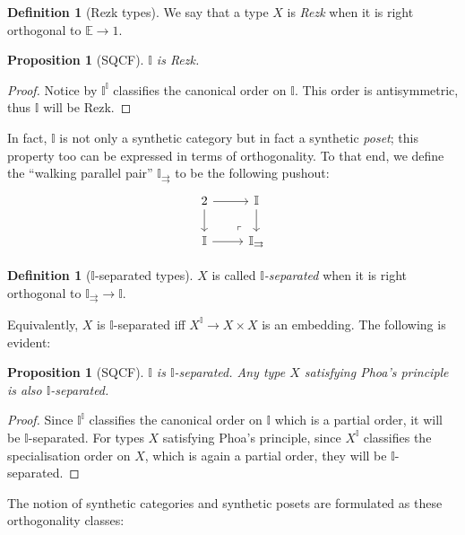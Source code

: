 \documentclass[a4paper,12pt]{amsart}
\newtheorem{proposition}[theorem]{Proposition}
\theoremstyle{definition}
\newtheorem{definition}[theorem]{Definition}
\newcommand{\mbb}[1]{\mathbb{#1}}
\newcommand{\I}{\mbb I}
\begin{document}
\begin{definition}[Rezk types]
  We say that a type $X$ is \emph{Rezk} when it is right orthogonal to $\mbb E \to 1$.
\end{definition}

\begin{proposition}[SQCF]
  $\I$ is Rezk.
\end{proposition}
\begin{proof}
  Notice by  $\I^\I$ classifies the canonical order on $\I$. This order is antisymmetric, thus $\I$ will be Rezk.
\end{proof}

In fact, $\I$ is not only a synthetic category but in fact a synthetic \emph{poset}; this property too can be expressed in terms of orthogonality. To that end, we define the ``walking parallel pair'' $\I_{\rightrightarrows}$ to be the following pushout:
\[
\begin{tikzcd}
  2 \ar[r] \ar[d] & \I \ar[d] \\ 
  \I \ar[r] & \I_{\rightrightarrows}
  \arrow["\lrcorner"{anchor=center, pos=0.125, rotate=180}, draw=none, from=2-2, to=1-1]
\end{tikzcd}
\]

\begin{definition}[$\I$-separated types]
  $X$ is called \emph{$\I$-separated} when it is right orthogonal to $\I_{\rightrightarrows} \to \I$.
\end{definition}

Equivalently, $X$ is $\I$-separated iff $X^\I \to X \times X$ is an embedding. The following is evident:

\begin{proposition}[SQCF]
  $\I$ is $\I$-separated. Any type $X$ satisfying Phoa's principle is also $\I$-separated.
\end{proposition}
\begin{proof}
  Since $\I^\I$ classifies the canonical order on $\I$ which is a partial order, it will be $\I$-separated. For types $X$ satisfying Phoa's principle, since $X^\I$ classifies the specialisation order on $X$, which is again a partial order, they will be $\I$-separated.
\end{proof}

The notion of synthetic categories and synthetic posets are formulated as these orthogonality classes:

\end{document}
